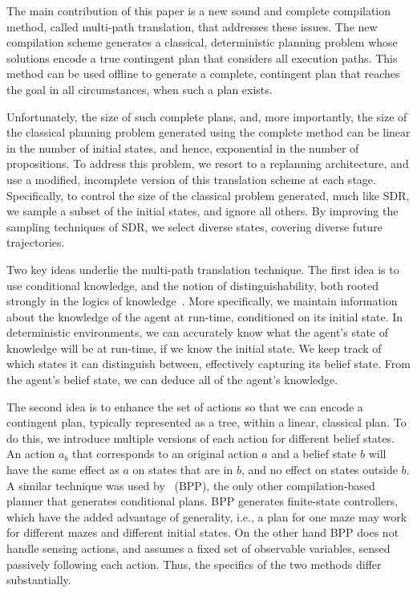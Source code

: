 \documentclass[letterpaper]{article}
\numberwithin{equation}{section}	%
\begin{document}
The main contribution of this paper is a new sound and complete compilation method, called multi-path translation, that addresses these issues.
The new compilation scheme generates a classical, deterministic planning problem whose solutions encode a true contingent plan that considers all execution paths.
This method can be used offline to generate a complete, contingent plan that reaches the goal in all circumstances, when such a plan exists.

Unfortunately, the size of such complete plans, and, more importantly, the size of the classical planning problem generated using
the complete method can be linear in the number of initial states, and hence, exponential in the number of propositions.
To address this problem, we resort to a replanning architecture, and use a modified, incomplete version of this translation scheme at each stage.
Specifically, to control the size of the classical problem generated, much like SDR, we sample a subset of the initial states, and ignore all others.
By improving the sampling techniques of SDR, we select diverse states, covering diverse future trajectories.

Two key ideas underlie the multi-path translation technique. The first idea is to use conditional knowledge, and the notion of
distinguishability, both rooted strongly in the logics of knowledge~\citep{FHMV94}.
More specifically, we maintain information about the knowledge of the agent at run-time, conditioned on its initial state.
In deterministic environments, we can accurately know what the agent's state of knowledge will be at run-time, if we know
the initial state. We keep track of which states it can distinguish between, effectively capturing its belief state.
From the agent's belief state, we can deduce all of the agent's knowledge.


The second idea is to enhance the set of actions so that we can encode a contingent plan, typically represented as a tree,
within a linear, classical plan. To do this, we introduce multiple versions of each action for different belief states.
An action $a_b$ that corresponds to an original action $a$ and a belief state $b$ will have the same effect as $a$ on states that are in $b$, and no effect on states outside $b$.
A similar technique was used by~\citet{Bonet2009} (BPP), the only other compilation-based planner that generates
conditional plans. BPP generates finite-state controllers, which have the added advantage of generality, i.e.,
a plan for one maze may work for different mazes and
different initial states. On the other hand BPP does not handle sensing actions, and assumes a fixed set of observable variables, sensed
passively following each action. Thus, the specifics of the two methods differ substantially.
\end{document}
